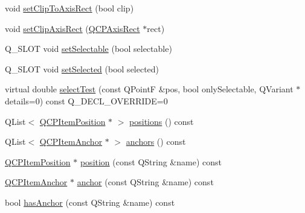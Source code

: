 \begin{DoxyCompactItemize}
\item 
void \hyperlink{classQCPAbstractItem_a39e05b9d4176b9accafc746d16ca6a06}{set\+Clip\+To\+Axis\+Rect} (bool clip)
\item 
void \hyperlink{classQCPAbstractItem_a7dc75fcbcd10206fe0b75d757ea7a347}{set\+Clip\+Axis\+Rect} (\hyperlink{classQCPAxisRect}{Q\+C\+P\+Axis\+Rect} $\ast$rect)
\item 
Q\+\_\+\+S\+L\+OT void \hyperlink{classQCPAbstractItem_a8a8e32a55bc478b849756a78c2d87fd2}{set\+Selectable} (bool selectable)
\item 
Q\+\_\+\+S\+L\+OT void \hyperlink{classQCPAbstractItem_a203de94ad586cc44d16c9565f49d3378}{set\+Selected} (bool selected)
\item 
virtual double \hyperlink{classQCPAbstractItem_ae41d0349d68bb802c49104afd100ba2a}{select\+Test} (const Q\+PointF \&pos, bool only\+Selectable, Q\+Variant $\ast$details=0) const Q\+\_\+\+D\+E\+C\+L\+\_\+\+O\+V\+E\+R\+R\+I\+DE=0
\item 
Q\+List$<$ \hyperlink{classQCPItemPosition}{Q\+C\+P\+Item\+Position} $\ast$ $>$ \hyperlink{classQCPAbstractItem_adf6a680cc29a6bce8345c3b6af3a91a1}{positions} () const 
\item 
Q\+List$<$ \hyperlink{classQCPItemAnchor}{Q\+C\+P\+Item\+Anchor} $\ast$ $>$ \hyperlink{classQCPAbstractItem_a8454b9941960b840608a5a1e00b1977d}{anchors} () const 
\item 
\hyperlink{classQCPItemPosition}{Q\+C\+P\+Item\+Position} $\ast$ \hyperlink{classQCPAbstractItem_af71345bd150f87fa1d2442837b87bb59}{position} (const Q\+String \&name) const 
\item 
\hyperlink{classQCPItemAnchor}{Q\+C\+P\+Item\+Anchor} $\ast$ \hyperlink{classQCPAbstractItem_abed974cba7cc02608c71dad4638e008d}{anchor} (const Q\+String \&name) const 
\item 
bool \hyperlink{classQCPAbstractItem_acbce9e5ba5252541d19db0c40303357a}{has\+Anchor} (const Q\+String \&name) const 
\end{DoxyCompactItemize}

